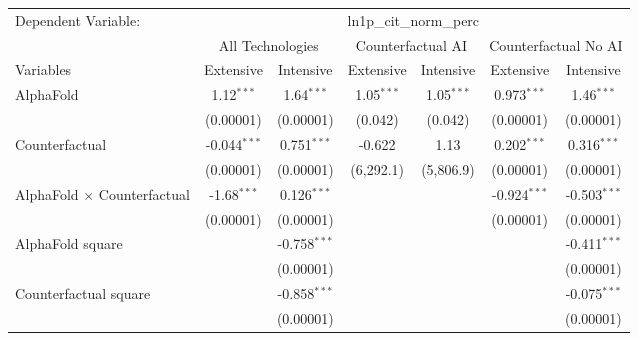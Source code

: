 \begingroup
\centering
\begin{tabular}{lcccccc}
   \tabularnewline \midrule \midrule
   Dependent Variable: & \multicolumn{6}{c}{ln1p\_cit\_norm\_perc}\\
 & \multicolumn{2}{c}{All Technologies} & \multicolumn{2}{c}{Counterfactual AI} & \multicolumn{2}{c}{Counterfactual No AI} \\
\cmidrule(lr){1-1}\cmidrule(lr){2-3} \cmidrule(lr){4-5} \cmidrule(lr){6-7}
Variables & \multicolumn{1}{c}{Extensive} & \multicolumn{1}{c}{Intensive} & \multicolumn{1}{c}{Extensive} & \multicolumn{1}{c}{Intensive} & \multicolumn{1}{c}{Extensive} & \multicolumn{1}{c}{Intensive} \\
\cmidrule(lr){1-1}\cmidrule(lr){2-2} \cmidrule(lr){3-3} \cmidrule(lr){4-4} \cmidrule(lr){5-5} \cmidrule(lr){6-6} \cmidrule(lr){7-7}
   AlphaFold                          & 1.12$^{***}$   & 1.64$^{***}$   & 1.05$^{***}$ & 1.05$^{***}$ & 0.973$^{***}$  & 1.46$^{***}$\\   
                                      & (0.00001)      & (0.00001)      & (0.042)      & (0.042)      & (0.00001)      & (0.00001)\\   
   Counterfactual                     & -0.044$^{***}$ & 0.751$^{***}$  & -0.622       & 1.13         & 0.202$^{***}$  & 0.316$^{***}$\\   
                                      & (0.00001)      & (0.00001)      & (6,292.1)    & (5,806.9)    & (0.00001)      & (0.00001)\\   
   AlphaFold $\times$ Counterfactual  & -1.68$^{***}$  & 0.126$^{***}$  &              &              & -0.924$^{***}$ & -0.503$^{***}$\\   
                                      & (0.00001)      & (0.00001)      &              &              & (0.00001)      & (0.00001)\\   
   AlphaFold square                   &                & -0.758$^{***}$ &              &              &                & -0.411$^{***}$\\   
                                      &                & (0.00001)      &              &              &                & (0.00001)\\   
   Counterfactual square              &                & -0.858$^{***}$ &              &              &                & -0.075$^{***}$\\   
                                      &                & (0.00001)      &              &              &                & (0.00001)\\   

\end{tabular}
